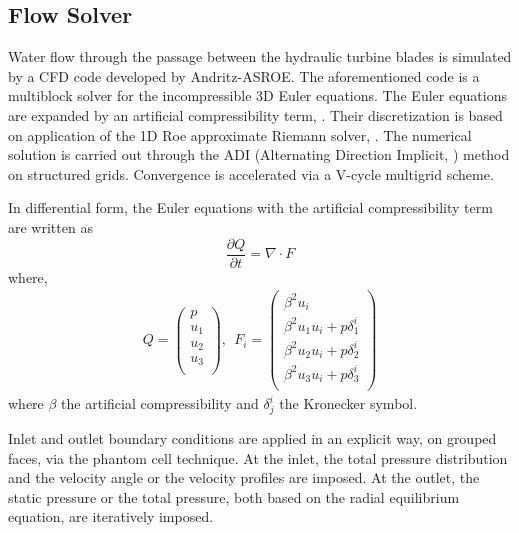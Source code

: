 \FloatBarrier
\subsection{Flow Solver}
\label{FlowSolvert}
Water flow through the passage between the hydraulic turbine blades is simulated by a CFD code developed by Andritz-ASROE. The aforementioned code is a multiblock solver for the incompressible 3D Euler equations. The Euler equations are expanded by an artificial compressibility term, \cite{Chorin,Turkel87}. Their discretization is based on application of the 1D Roe approximate Riemann solver, \cite{Roe81}. The numerical solution is carried out through the ADI (Alternating Direction Implicit, \cite{Peaceman}) method on structured grids. Convergence is accelerated via a V-cycle multigrid scheme.%


In differential form, the Euler equations with the artificial compressibility term are written as
\begin{equation} 
    \frac{\partial Q}{\partial t}=\nabla \cdot F
	\label{Euler1}
\end{equation}
where,
\begin{eqnarray}
		Q= \left( {\begin{array}{c}
 		p    \\
 		u_1  \\
 		u_2  \\
 		u_3  \\
 		\end{array} } \right)
 		, ~~ F_i= \left( {\begin{array}{c}
 		\beta ^2 u_i    \\
 		\beta ^2 u_1u_i + p\delta _1^i  \\
		\beta ^2 u_2u_i + p\delta _2^i  \\
 		\beta ^2 u_3u_i + p\delta _3^i  \\
 		\end{array} } \right)
\label{Euler3}
\end{eqnarray} 
where $\beta$ the artificial compressibility \cite{Chorin,Turkel87} and $\delta^i_j$ the Kronecker symbol.

Inlet and outlet boundary conditions are applied in an explicit way, on grouped faces, via the phantom cell technique. At the inlet, the total pressure distribution and the velocity angle or the velocity profiles are imposed. At the outlet, the static pressure or the total pressure, both based on the radial equilibrium equation, are iteratively imposed. 

